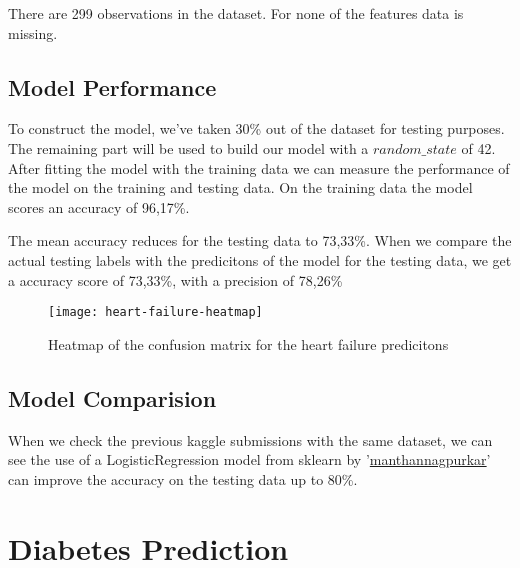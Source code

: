 \noindent There are 299 observations in the dataset. For none of the features data is missing.

\subsection{Model Performance}

To construct the model, we've taken 30\% out of the dataset for testing purposes. The remaining part will be used to build our model with a $random\_state$ of 42. After fitting the model with the training data we can measure the performance of the model on the training and testing data. On the training data the model scores an accuracy of 96,17\%.

The mean accuracy reduces for the testing data to 73,33\%. When we compare the actual testing labels with the predicitons of the model for the testing data, we get a accuracy score of 73,33\%, with a precision of 78,26\%

\begin{figure}[t]
  \begin{center}
    \texttt{[image: heart-failure-heatmap]}
    \caption{Heatmap of the confusion matrix for the heart failure predicitons}
  \end{center}
\end{figure}


\subsection{Model Comparision}

When we check the previous kaggle submissions with the same dataset, we can see the use of a LogisticRegression model from sklearn by '\href{https://www.kaggle.com/manthannagpurkar/heart-failure-prediction}{manthannagpurkar}' can improve the accuracy on the testing data up to 80\%.


\section{Diabetes Prediction}
\newcommand{\linkLogisticRegression}{https://scikit-learn.org/stable/modules/generated/sklearn.linear\_model.LogisticRegression.html}
\newcommand{\linkGaussianNB}{https://scikit-learn.org/stable/modules/generated/sklearn.naive\_bayes.GaussianNB.html?highlight=gaussiannb}
\newcommand{\linkRandomForestClassifier}{https://scikit-learn.org/stable/modules/generated/sklearn.ensemble.RandomForestClassifier.html?highlight=randomforestclassifier}



